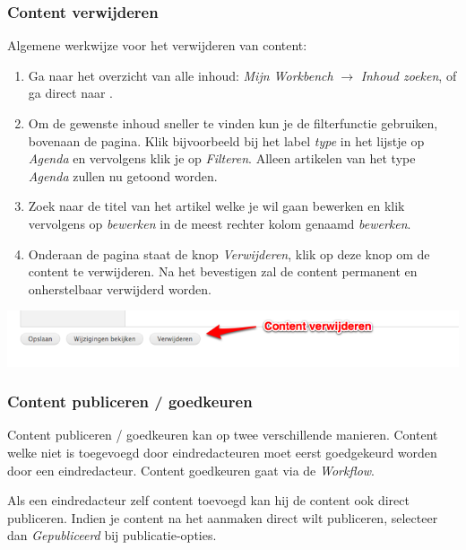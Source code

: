 \subsubsection{Content verwijderen}\label{contentverwijderen}
Algemene werkwijze voor het verwijderen van content:
\begin{enumerate}
\item Ga naar het overzicht van alle inhoud: \emph{Mijn Workbench} $\rightarrow$ \emph{Inhoud zoeken}, of ga direct naar .
\item Om de gewenste inhoud sneller te vinden kun je de filterfunctie gebruiken, bovenaan de pagina. Klik bijvoorbeeld bij het label \emph{type} in het lijstje op \emph{Agenda} en vervolgens klik je op \emph{Filteren}. Alleen artikelen van het type \emph{Agenda} zullen nu getoond worden.
\item Zoek naar de titel van het artikel welke je wil gaan bewerken en klik vervolgens op \emph{bewerken} in de meest rechter kolom genaamd \emph{bewerken}.
\item Onderaan de pagina staat de knop \emph{Verwijderen}, klik op deze knop om de content te verwijderen. Na het bevestigen zal de content permanent en onherstelbaar verwijderd worden.
\end{enumerate}

\bigskip

\begin{center}
	\includegraphics[width=\textwidth]{img/content3.png}
\end{center}

\subsubsection{Content publiceren / goedkeuren}\label{contentpubliceren}
Content publiceren / goedkeuren kan op twee verschillende manieren. Content welke niet is toegevoegd door eindredacteuren moet eerst goedgekeurd worden door een eindredacteur. Content goedkeuren gaat via de \emph{Workflow}.

Als een eindredacteur zelf content toevoegd kan hij de content ook direct publiceren. Indien je content na het aanmaken direct wilt publiceren, selecteer dan \emph{Gepubliceerd} bij publicatie-opties. 

